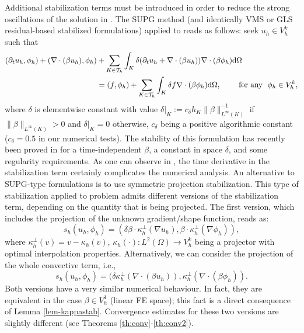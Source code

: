 Additional stabilization terms must be introduced in order to reduce the strong oscillations of the solution in . The SUPG method (and identically VMS or GLS residual-based stabilized formulations) applied to  reads as follows: seek $u_h \in V^k_h$ such that
\begin{align*}%
(\partial_t u_h,\phi_h) +   (\nabla \cdot (\beta u_h),\phi_h) &+ \sum_{K \in \mathcal{T}_h} \int_K \delta (\partial_t u_h + \nabla \cdot (\beta u_h)) \nabla \cdot (\beta  \phi_h) {\rm d} \Omega \nonumber \\ &= (f ,  \phi_h ) + \sum_{K \in \mathcal{T}_h} \int_K \delta f \nabla \cdot (\beta \phi_h) {\rm d} \Omega, \qquad \hbox{ for any }  \ \phi_h \in V^k_h, 
\end{align*}
where $\delta$ is elementwise constant with value $\delta|_K := c_{\delta} {h_K}{\| \beta \|_{L^\infty(K)}^{-1}}$ if $\| \beta \|_{L^\infty(K)}>0$ and $\delta|_K = 0$ otherwise, $c_{\delta}$ being a positive algorithmic constant ($c_{\delta} = 0.5$ in our numerical tests). The stability of this formulation has recently been proved in \cite{burman_consistent_2010} for a time-independent $\beta$, a constant in space $\delta$, and some regularity requirements. As one can observe in \cite{burman_consistent_2010}, the time derivative in the stabilization term certainly complicates the numerical analysis. An alternative to SUPG-type formulations is to use symmetric projection stabilization. 
This type of stabilization applied to problem  admits different versions of the stabilization term, depending on the quantity that is being projected. The first version, which includes the projection of the unknown gradient/shape function, reads as:
\begin{equation}\label{eq-stproj1}
s_h(u_h,\phi_h) = ( \delta \beta \cdot \kappa_h^{\perp}(\nabla u_h), \beta \cdot \kappa_h^{\perp}(\nabla \phi_h)), 
\end{equation}
where $\kappa_h^\perp(v) = v - \kappa_h(v)$, $\kappa_h(\cdot): L^2(\Omega) \longrightarrow V^k_h$ being a projector with optimal interpolation properties. Alternatively, we can consider the projection of the whole convective term, i.e.,
\begin{equation}\label{eq-stproj2}
s_h(u_h,\phi_h) = ( \delta \kappa_h^{\perp}(\nabla\cdot (\beta u_h)),  \kappa_h^{\perp}(\nabla\cdot (\beta \phi_h)). 
\end{equation}
Both versions have a very similar numerical behaviour. In fact, they are equivalent in the case $\beta  \in V_h^1$ (linear FE space); this fact is a direct consequence of Lemma \ref{lem-kappastab}. Convergence estimates for these two versions are slightly different (see Theorems \ref{th:conv}-\ref{th:conv2}).


